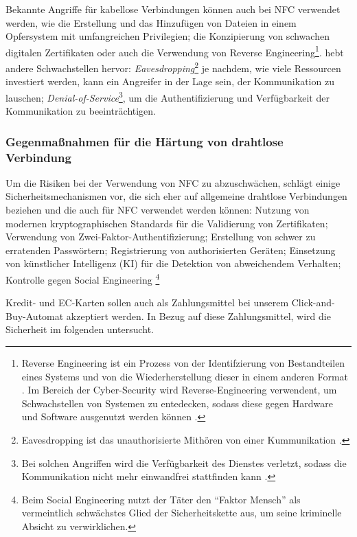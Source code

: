 Bekannte Angriffe für kabellose Verbindungen können auch bei NFC verwendet werden\cite{refip:NYRS}, wie die
Erstellung und das Hinzufügen von Dateien in einem Opfersystem mit umfangreichen Privilegien; die Konzipierung
von schwachen digitalen Zertifikaten oder auch die Verwendung von Reverse Engineering\footnote{Reverse
Engineering ist ein Prozess von der Identifzierung von Bestandteilen eines Systems und von die Wiederherstellung 
dieser in einem anderen Format \cite{refart:CHRE}. Im Bereich der Cyber-Security wird Reverse-Engineering 
verwendent, um Schwachstellen von Systemen zu entedecken, sodass diese gegen Hardware und Software ausgenutzt
werden können \cite{refip:CMBM}.}. \cite{refart:ALSI} hebt andere Schwachstellen hervor: 
\textit{Eavesdropping}\footnote{Eavesdropping ist das unauthorisierte Mithören von einer Kummunikation 
\cite{refbook:SWIS}.} je nachdem, wie viele Ressourcen investiert werden, kann ein Angreifer in der 
Lage sein, der Kommunikation zu lauschen; \textit{Denial-of-Service}\footnote{Bei solchen Angriffen wird die
Verfügbarkeit des Dienstes verletzt, sodass die Kommunikation nicht mehr einwandfrei stattfinden kann 
\cite{refbook:SWIS}.}, um die Authentifizierung und Verfügbarkeit der Kommunikation zu beeinträchtigen.


\subsubsection{Gegenmaßnahmen für die Härtung von drahtlose Verbindung}

Um die Risiken bei der Verwendung von NFC zu abzuschwächen, schlägt \cite{refip:NYRS} einige Sicherheitsmechanismen vor, 
die sich eher auf allgemeine drahtlose Verbindungen beziehen und die auch für NFC verwendet werden können: Nutzung von modernen 
kryptographischen Standards für die Validierung von Zertifikaten; Verwendung von Zwei-Faktor-Authentifizierung; Erstellung
von schwer zu erratenden Passwörtern; Registrierung von authorisierten Geräten; Einsetzung von künstlicher Intelligenz 
(KI) für die Detektion von abweichendem Verhalten; Kontrolle gegen Social Engineering \footnote{Beim Social Engineering
nutzt der Täter den ``Faktor Mensch'' als vermeintlich schwächstes Glied der Sicherheitskette aus, um seine kriminelle
Absicht zu verwirklichen.\cite{booklet:BSSE}}

Kredit- und EC-Karten sollen auch als Zahlungsmittel bei unserem Click-and-Buy-Automat akzeptiert werden. 
In Bezug auf diese Zahlungsmittel, wird die Sicherheit im folgenden untersucht.

